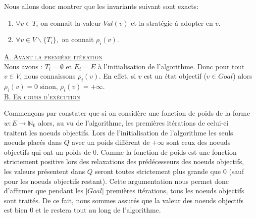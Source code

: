 $\text{}$\\
\noindent Nous allons donc montrer que les invariants suivant sont exacts: 

\begin{enumerate}
	\item $\forall v \in T_i$ on connait la valeur $Val(v)$ et la stratégie à adopter en $v$.
	\item $\forall v \in V \backslash \{ T_i \},$ on connait $\rho_i(v)$.
\end{enumerate}
	
\noindent \underline{\textsc{A. Avant la première itération}}\\

Nous avons : $T_i = \emptyset$ et $E_i = E$ à l'initialisation de l'algorithme. Donc pour tout $v \in V$, nous connaissons $\rho_i(v)$. En effet, si $v$ est un état objectif ($v \in Goal$) alors $\rho_i(v) = 0$ sinon, $\rho_i(v) = + \infty$.\\

\noindent \underline{\textsc{B. En cours d'exécution}}\\

Commençons par constater que si on considère une fonction de poids de la forme $w: E \rightarrow \mathbb{N}_{0}$ alors, au vu de l'algorithme, les premières itérations de celui-ci traitent les noeuds objectifs. Lors de l'initialisation de l'algorithme les seuls noeuds placés dans $Q$ avec un poids différent de $ + \infty$ sont ceux des noeuds objectifs qui ont un poids de 0. Comme la fonction de poids est une fonction strictement positive lors des relaxations des prédécesseurs des noeuds objectifs, les valeurs présentent dans $Q$ seront toutes strictement plus grande que 0 (sauf pour les noeuds objectifs restant). Cette argumentation nous permet donc d'affirmer que pendant les $|Goal|$ premières itérations, tous les noeuds objectifs sont traités. De ce fait, nous sommes assurés que la valeur des noeuds objectifs est bien 0 et le restera tout au long de l'algorithme.

